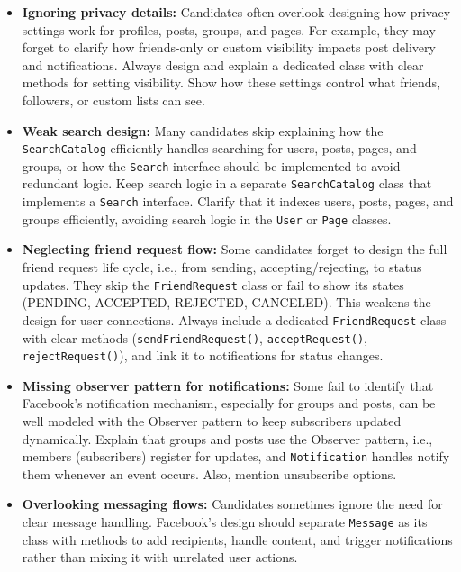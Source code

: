 \begin{itemize}
\item
\protect{}\label{ecfltY9S6G1RlYVlXWP6V}
\textbf{Ignoring privacy details:} Candidates often overlook designing how privacy settings work for profiles, posts, groups, and pages. For example, they may forget to clarify how friends-only or custom visibility impacts post delivery and notifications. Always design and explain a dedicated class with clear methods for setting visibility. Show how these settings control what friends, followers, or custom lists can see.
\item
\protect{}\label{igcaS7oKHF2Pbqsnxg4KV}
\textbf{Weak search design:} Many candidates skip explaining how the \texttt{SearchCatalog} efficiently handles searching for users, posts, pages, and groups, or how the \texttt{Search} interface should be implemented to avoid redundant logic. Keep search logic in a separate \texttt{SearchCatalog} class that implements a \texttt{Search} interface. Clarify that it indexes users, posts, pages, and groups efficiently, avoiding search logic in the \texttt{User} or \texttt{Page} classes.
\item
\protect{}\label{V84qmDoGNYzEqyOM7Pl9W}
\textbf{Neglecting friend request flow:} Some candidates forget to design the full friend request life cycle, i.e., from sending, accepting/rejecting, to status updates. They skip the \texttt{FriendRequest} class or fail to show its states (PENDING, ACCEPTED, REJECTED, CANCELED). This weakens the design for user connections. Always include a dedicated \texttt{FriendRequest} class with clear methods (\texttt{sendFriendRequest()}, \texttt{acceptRequest()}, \texttt{rejectRequest()}), and link it to notifications for status changes.
\item
\protect{}\label{XQ-GlMKKGAaJCj5XTwfey}
\textbf{Missing observer pattern for notifications:} Some fail to identify that Facebook's notification mechanism, especially for groups and posts, can be well modeled with the Observer pattern to keep subscribers updated dynamically. Explain that groups and posts use the Observer pattern, i.e., members (subscribers) register for updates, and \texttt{Notification} handles notify them whenever an event occurs. Also, mention unsubscribe options.
\item
\protect{}\label{cFGGChnEh4IutULsWaeLz}
\textbf{Overlooking messaging flows:} Candidates sometimes ignore the need for clear message handling. Facebook's design should separate \texttt{Message} as its class with methods to add recipients, handle content, and trigger notifications rather than mixing it with unrelated user actions.
\end{itemize}

